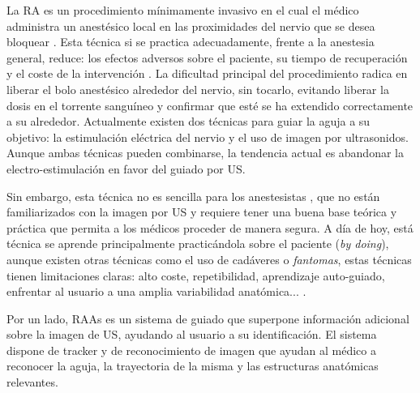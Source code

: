 La \ac{RA} es un procedimiento mínimamente invasivo en el cual el médico administra un anestésico local en las proximidades del nervio que se desea bloquear \cite{CVraisra}. Esta técnica si se practica adecuadamente, frente a la anestesia general, reduce: los efectos adversos sobre el paciente, su tiempo de recuperación y el coste de la intervención \cite{PMID:26695878}. La dificultad principal del procedimiento radica en liberar el bolo anestésico alrededor del nervio, sin tocarlo, evitando liberar la dosis en el torrente sanguíneo y confirmar que esté se ha extendido correctamente a su alrededor. Actualmente existen dos técnicas para guiar la aguja a su objetivo: la estimulación eléctrica del nervio y el uso de imagen por ultrasonidos. Aunque ambas técnicas pueden combinarse, la tendencia actual es abandonar la electro-estimulación en favor del guiado por \ac{US}.

Sin embargo, esta técnica no es sencilla para los anestesistas , que no están familiarizados con la imagen por \ac{US} y requiere tener una buena base teórica y práctica  que permita a los médicos proceder de manera segura.  A día de hoy, está técnica se aprende principalmente practicándola sobre el paciente (\emph{by doing}), aunque existen otras técnicas como el uso de cadáveres\cite{Tsui2007} o \emph{fantomas}\cite{phantomra}, estas técnicas tienen limitaciones claras: alto coste, repetibilidad, aprendizaje auto-guiado, enfrentar al usuario a una amplia variabilidad anatómica... .

Por un lado, \ac{RAAs} es un sistema de guiado que superpone información adicional sobre la imagen de \ac{US}, ayudando al usuario a su identificación. El sistema dispone de \ac{tracker} y de reconocimiento de imagen que ayudan al médico a reconocer la aguja, la trayectoria de la misma y las estructuras anatómicas relevantes. 

